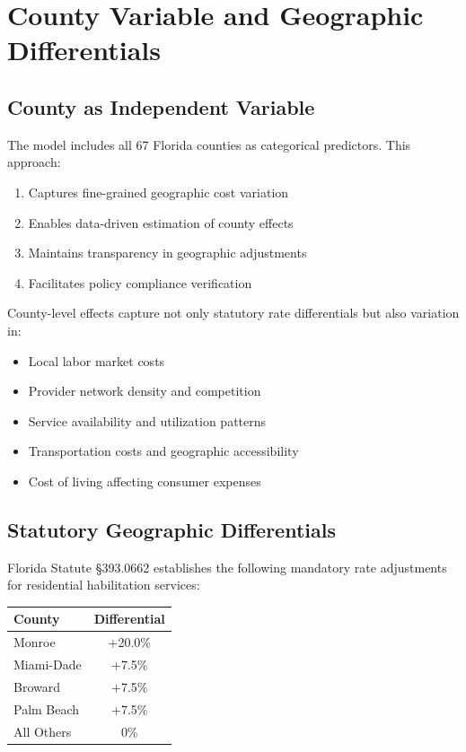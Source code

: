 \section{County Variable and Geographic Differentials}

\subsection{County as Independent Variable}

The model includes all 67 Florida counties as categorical predictors. This approach:
\begin{enumerate}
    \item Captures fine-grained geographic cost variation
    \item Enables data-driven estimation of county effects
    \item Maintains transparency in geographic adjustments
    \item Facilitates policy compliance verification
\end{enumerate}

County-level effects capture not only statutory rate differentials but also variation in:
\begin{itemize}
    \item Local labor market costs
    \item Provider network density and competition
    \item Service availability and utilization patterns
    \item Transportation costs and geographic accessibility
    \item Cost of living affecting consumer expenses
\end{itemize}

\subsection{Statutory Geographic Differentials}

Florida Statute §393.0662 establishes the following mandatory rate adjustments for residential habilitation services:

\begin{center}
\begin{tabular}{|l|c|}
\hline
\textbf{County} & \textbf{Differential} \\
\hline
Monroe & +20.0\% \\
\hline
Miami-Dade & +7.5\% \\
\hline
Broward & +7.5\% \\
\hline
Palm Beach & +7.5\% \\
\hline
All Others & 0\% \\
\hline
\end{tabular}
\end{center}

